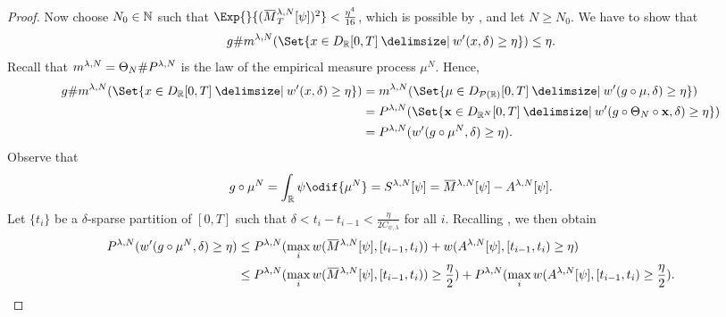 \begin{proof}
  Now choose \( N_0 \in \mathbb{N} \) such that \(\Exp{}{ ( \ol{M}_T^{\lambda, N}[\psi] )^2 } < \frac{\eta^4}{16}\), which is possible by , and let \(N \geq N_0\).
  We have to show that
  \begin{equation}
    g \# \lawmu^{\lambda, N}(\Set{ x \in D_{\potspace}[0,T] \given w'(x,\delta) \geq \eta }) \leq \eta.
  \end{equation}
  Recall that \(m^{\lambda, N} = \Theta_N \# P^{\lambda, N}\) is the law of the empirical measure process \(\mu^N\).
  Hence,
  \begin{equation}
    \begin{split}
      g \# \lawmu^{\lambda, N}(\Set{ x \in D_{\potspace}[0,T] \given w'(x,\delta) \geq \eta })
       & = \lawmu^{\lambda, N}(\Set{ \mu \in D_{\cP(\potspace)}[0,T] \given w'(g \circ \mu,\delta) \geq \eta })              \\
       & = P^{\lambda, N}(\Set{ \bm{x} \in D_{\potspace^N}[0,T] \given w'(g \circ \Theta_N \circ \bm{x},\delta) \geq \eta }) \\
      & = P^{\lambda, N}( w'(g \circ \mu^N,\delta) \geq \eta ).
    \end{split}
  \end{equation}
  Observe that
  \begin{equation}
    g \circ \mu^N = \int_\potspace \psi \odif{\mu^N} = S^{\lambda, N}[\psi] = \ol{M}^{\lambda, N}[\psi] - A^{\lambda, N}[\psi].
  \end{equation}
  Let \( \{t_i\} \) be a \( \delta \)-sparse partition of \( [0,T] \) such that \(\delta < t_i - t_{i-1} < \frac{\eta}{2C_{\psi, \lambda}}\) for all \( i \).
  Recalling , we then obtain %
  \begin{equation}
    \begin{split}
      P^{\lambda, N} (w'(g \circ \mu^N, \delta) \geq \eta)
       & \leq P^{\lambda, N}( \max_i w(\ol{M}^{\lambda, N}[\psi], [t_{i-1}, t_i)) + w(A^{\lambda, N}[\psi], [t_{i-1}, t_i) \geq \eta)                                                        \\
       & \leq P^{\lambda, N}( \max_i w(\ol{M}^{\lambda, N}[\psi], [t_{i-1}, t_i)) \geq \frac{\eta}{2}) + P^{\lambda, N}( \max_i w(A^{\lambda, N}[\psi], [t_{i-1}, t_i) \geq \frac{\eta}{2}).
    \end{split}
  \end{equation}

\end{proof}
